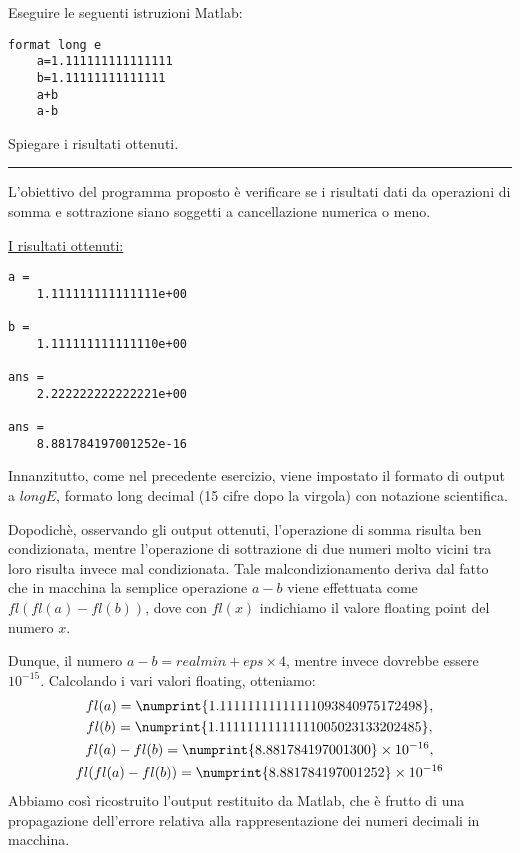 Eseguire le seguenti istruzioni Matlab:
\begin{lstlisting}[caption = {}]
	format long e
	a=1.111111111111111
	b=1.11111111111111
	a+b
	a-b
\end{lstlisting}
Spiegare i risultati ottenuti.

\hspace*{\fill}
\par\noindent\rule{\textwidth}{0.4pt}
\hspace*{\fill}

L'obiettivo del programma proposto è verificare se i risultati dati da operazioni di somma e sottrazione siano soggetti a cancellazione numerica o meno.

\underline{I risultati ottenuti:}
\begin{lstlisting}[caption = {}]
a =
	1.111111111111111e+00

b =
	1.111111111111110e+00

ans =
	2.222222222222221e+00

ans =
	8.881784197001252e-16

\end{lstlisting}

Innanzitutto, come nel precedente esercizio, viene impostato il formato di output a $longE$, formato long decimal (15 cifre dopo la virgola) con notazione scientifica.

Dopodichè, osservando gli output ottenuti, l'operazione di somma risulta ben condizionata, mentre l'operazione di sottrazione di due numeri
molto vicini tra loro risulta invece mal condizionata.
Tale malcondizionamento deriva dal fatto che in macchina la semplice operazione $a-b$ viene effettuata come $fl(fl(a)-fl(b))$, dove con $fl(x)$
indichiamo il valore floating point del numero $x$.

Dunque, il numero $a-b = realmin + eps\times4$, mentre invece dovrebbe essere $10^{-15}$. Calcolando i vari valori floating, otteniamo:
\begin{equation*}
\begin{gathered}
		fl(a) = \numprint{1.11111111111111093840975172498}, \\
		fl(b) = \numprint{1.11111111111111005023133202485}, \\
		fl(a) - fl(b) = \numprint{8.881784197001300}\times10^{-16}, \\
		fl(fl(a) - fl(b)) = \numprint{8.881784197001252}\times10^{-16}
\end{gathered}
\end{equation*}
Abbiamo così ricostruito l'output restituito da Matlab, che è frutto di una propagazione dell'errore relativa alla rappresentazione dei numeri decimali in macchina.
